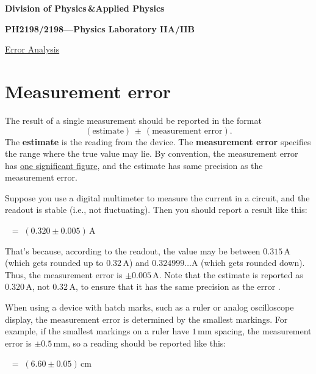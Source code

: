 \documentclass[11pt,a4paper]{article}
\begin{document}
\begin{center}
\textbf{Division of Physics\;\,\&\;Applied Physics}

\textbf{PH2198/2198---Physics Laboratory IIA/IIB}

\vskip 0.05in

\underline{\Huge Error Analysis}
\end{center}

\section{Measurement error}

The result of a single measurement should be reported in the format
\begin{equation*}
  (\textrm{estimate})\, \pm\, (\textrm{measurement error}).
\end{equation*}
The \textbf{estimate} is the reading from the device.  The
\textbf{measurement error} specifies the range where the true value
may lie.  By convention, the measurement error has \underline{one
  significant figure}, and the estimate has same precision as the
measurement error.

Suppose you use a digital multimeter to measure the current in a
circuit, and the readout is stable (i.e., not fluctuating).  Then you
should report a result like this:
\begin{center}
$\;\;=\; \left(0.320 \pm 0.005\right) \, \mathrm{A}$
\end{center}
That's because, according to the readout, the value may be between
$0.315\,\mathrm{A}$ (which gets rounded up to $0.32\,\mathrm{A}$) and
$0.324999\dots\mathrm{A}$ (which gets rounded down).  Thus, the
measurement error is $\pm 0.005 \, \mathrm{A}$.  Note that the
estimate is reported as $0.320 \,\mathrm{A}$, not $0.32\,\mathrm{A}$,
to ensure that it has the same precision as the error \cite{Hughes}.

When using a device with hatch marks, such as a ruler or analog
oscilloscope display, the measurement error is determined by the
smallest markings.  For example, if the smallest markings on a ruler
have $1\,\mathrm{mm}$ spacing, the measurement error is $\pm 0.5
\,\textrm{mm}$, so a reading should be reported like this:
\begin{center}
$\;\;=\; \left(6.60 \pm 0.05\right) \, \mathrm{cm}$
\end{center}
\end{document}
